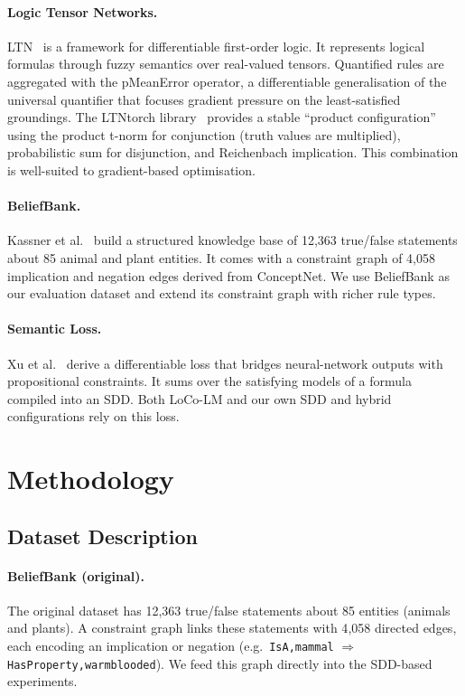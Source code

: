 \documentclass[11pt,a4paper]{article}
\begin{document}
\paragraph{Logic Tensor Networks.}
LTN~\cite{badreddine2022ltn} is a framework for differentiable
first-order logic.  It represents logical formulas through fuzzy semantics
over real-valued tensors.  Quantified rules are aggregated with the
pMeanError operator, a differentiable generalisation of the
universal quantifier that focuses gradient pressure on the
least-satisfied groundings.  The LTNtorch library~\cite{ltntorch2024}
provides a stable ``product configuration'' using the product t-norm for
conjunction (truth values are multiplied), probabilistic sum for
disjunction, and Reichenbach implication.  This combination is
well-suited to gradient-based optimisation.

\paragraph{BeliefBank.}
Kassner et al.~\cite{kassner2021beliefbank} build a structured knowledge
base of 12{,}363 true/false statements about 85 animal and plant entities.
It comes with a constraint graph of 4{,}058 implication and negation edges
derived from ConceptNet.  We use BeliefBank as our evaluation dataset and
extend its constraint graph with richer rule types.

\paragraph{Semantic Loss.}
Xu et al.~\cite{xu2018semantic} derive a differentiable loss that bridges
neural-network outputs with propositional constraints.  It sums over the
satisfying models of a formula compiled into an SDD.  Both LoCo-LM and our
own SDD and hybrid configurations rely on this loss.

\section{Methodology}

\subsection{Dataset Description}

\paragraph{BeliefBank (original).}
The original dataset has 12{,}363 true/false statements about 85 entities
(animals and plants).  A constraint graph links these statements with
4{,}058 directed edges, each encoding an implication or negation
(e.g.\ \texttt{IsA,mammal} $\Rightarrow$
\texttt{HasProperty,warm\-blooded}).  We feed this graph directly into the
SDD-based experiments.
\end{document}

